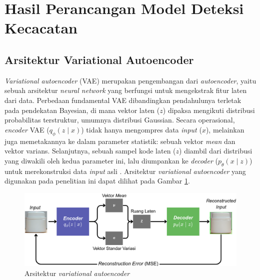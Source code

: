 \vspace{1em}

\section{Hasil Perancangan Model Deteksi Kecacatan}
\subsection{Arsitektur Variational Autoencoder}
\textit{Variational autoencoder} (VAE) merupakan pengembangan dari
\textit{autoencoder}, yaitu sebuah arsitektur \textit{neural network}
yang berfungsi untuk mengekstrak fitur laten dari data. Perbedaan
fundamental VAE dibandingkan pendahulunya terletak pada pendekatan
Bayesian, di mana vektor laten ($z$) dipaksa mengikuti distribusi
probabilitas terstruktur, umumnya distribusi Gaussian. Secara
operasional, \textit{encoder} VAE ($q_{\phi}(z \mid x)$) tidak hanya
mengompres data \textit{input} ($x$), melainkan juga memetakannya
ke dalam parameter statistik: sebuah vektor \textit{mean} dan
vektor varians. Selanjutnya, sebuah sampel kode laten ($z$) diambil
dari distribusi yang diwakili oleh kedua parameter ini, lalu diumpankan
ke \textit{decoder} ($p_{\theta}(x \mid z)$) untuk merekonstruksi
data \textit{input}
asli \citep{25}. Arsitektur \textit{variational autoencoder} yang digunakan pada
penelitian ini dapat dilihat pada Gambar \ref{fig:arsitektur-autoencoder}.

\begin{figure}[H]
  \centering
  \includegraphics[width=\textwidth]{gambar/arsitektur_autoencoder.png}
  \caption{Arsitektur \textit{variational autoencoder}}
  \label{fig:arsitektur-autoencoder}
\end{figure}
\vspace{-1em}

